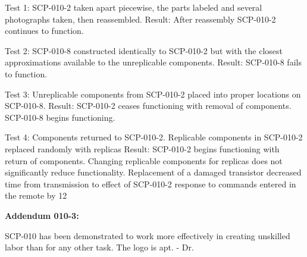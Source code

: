 Test 1: SCP-010-2 taken apart piecewise, the parts labeled and several photographs taken, then reassembled.
Result: After reassembly SCP-010-2 continues to function.

Test 2: SCP-010-8 constructed identically to SCP-010-2 but with the closest approximations available to the unreplicable components.
Result: SCP-010-8 fails to function.

Test 3: Unreplicable components from SCP-010-2 placed into proper locations on SCP-010-8.
Result: SCP-010-2 ceases functioning with removal of components. SCP-010-8 begins functioning.

Test 4: Components returned to SCP-010-2. Replicable components in SCP-010-2 replaced randomly with replicas
Result: SCP-010-2 begins functioning with return of components. Changing replicable components for replicas does not significantly reduce functionality. Replacement of a damaged transistor decreased time from transmission to effect of SCP-010-2 response to commands entered in the remote by 12%

\textbf{Addendum 010-3:}

SCP-010 has been demonstrated to work more effectively in creating unskilled labor than for any other task. The logo is apt. - Dr. 